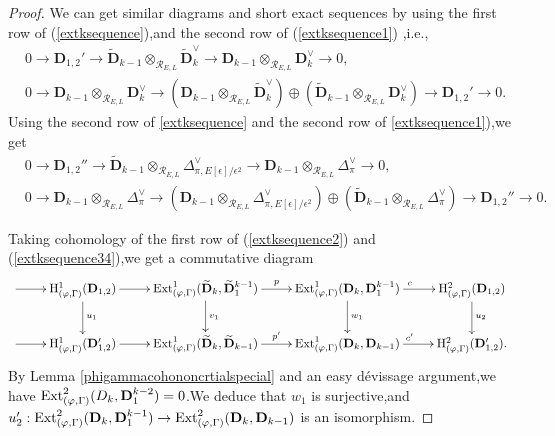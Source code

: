 \documentclass[SecEq,CM,GP]{degruyter-crelle} %
\theoremstyle{plain}
\newcommand{\Dpik}{{\mathbf{D}}}
\newcommand{\ext}{{\rm Ext}}
\newcommand{\hH}{{\mathrm{H}}}
\newcommand{\tee}{{{\otimes}_{\cR_{E,L}}}}
\newcommand{\cR}{\mathcal R}
\begin{document}
\begin{proof}
We can get similar diagrams  and short exact sequences by using the first row of (\ref{extksequence}),\;and the second row of (\ref{extksequence1}) ,\;i.e.,\;
\begin{equation}\label{extksequence34}
	\begin{aligned}
		&0\rightarrow \Dpik_{1,2}'\rightarrow \widetilde{\Dpik}_{k-1}\tee \widetilde{\Dpik}_{k}^\vee \rightarrow {\Dpik}_{k-1}\tee \Dpik_{k}^\vee\rightarrow 0,\\
		&0\rightarrow {\Dpik}_{k-1}\tee \Dpik_{k}^\vee \rightarrow  ({\Dpik}_{k-1}\tee \widetilde{\Dpik}_{k}^\vee)\oplus(\widetilde{\Dpik}_{k-1}\tee \Dpik_{k}^\vee) \rightarrow \Dpik_{1,2}'\rightarrow 0.
	\end{aligned}
\end{equation}
Using the second row of \ref{extksequence} and the second row of \ref{extksequence1}),\;we get
\begin{equation}\label{extksequence345}
	\begin{aligned}
		&0\rightarrow \Dpik_{1,2}''\rightarrow \widetilde{\Dpik}_{k-1}\tee \Delta_{\pi,E[\epsilon]/\epsilon^2}^\vee \rightarrow {\Dpik}_{k-1}\tee \Delta_\pi^\vee\rightarrow 0,\\
		&0\rightarrow {\Dpik}_{k-1}\tee \Delta_\pi^\vee \rightarrow  ({\Dpik}_{k-1}\tee \Delta_{\pi,E[\epsilon]/\epsilon^2}^\vee)\oplus(\widetilde{\Dpik}_{k-1}\tee \Delta_\pi^\vee) \rightarrow \Dpik_{1,2}''\rightarrow 0.\;
	\end{aligned}
\end{equation}


Taking cohomology of  the first row of  (\ref{extksequence2}) and (\ref{extksequence34}),\;we get a commutative diagram 
\begin{equation}\label{cgs1}
	\xymatrix{ \ar[r] & \hH^1_{(\varphi,\Gamma)}(\Dpik_{1,2}) \ar[d]^{u_1}  \ar[r] & \ext^1_{(\varphi,\Gamma)}(\widetilde{\Dpik}_{k},\widetilde{\Dpik}_1^{k-1}) \ar[d]^{v_1}  \ar[r]^{p}  & \ext^1_{(\varphi,\Gamma)}(\Dpik_{k},\Dpik_{1}^{k-1}) \ar[d]^{w_1} \ar[r]^{c} & \hH^2_{(\varphi,\Gamma)}(\Dpik_{1,2}) \ar[d]^{u_2}\\
		\ar[r] & \hH^1_{(\varphi,\Gamma)}(\Dpik_{1,2}')   \ar[r]
		& \ext^1_{(\varphi,\Gamma)}(\widetilde{\Dpik}_{k},\widetilde{\Dpik}_{k-1})  \ar[r]^{p'} & \ext^1_{(\varphi,\Gamma)}(\Dpik_{k},\Dpik_{k-1})  \ar[r]^{c'}  & \hH^2_{(\varphi,\Gamma)}(\Dpik_{1,2}')
		.}
\end{equation}
By Lemma \ref{phigammacohononcrtialspecial} and an easy d\'{e}vissage argument,\;we have $\ext^2_{(\varphi,\Gamma)}(D_k,\Dpik_{1}^{k-2})=0$.\;We deduce that
$w_1$ is surjective,\;and $u_2':\ext^2_{(\varphi,\Gamma)}(\Dpik_{k},\Dpik_{1}^{k-1})\rightarrow \ext^2_{(\varphi,\Gamma)}(\Dpik_{k},\Dpik_{k-1})$ is an isomorphism.\;


\end{proof}
\end{document}
